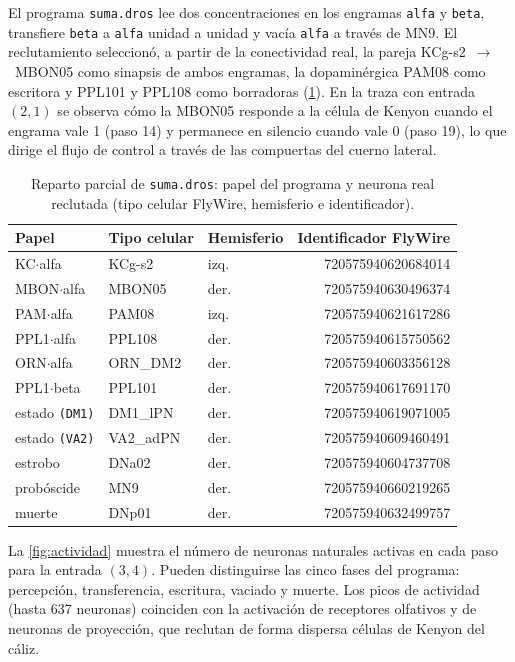 \documentclass[11pt,a4paper]{article}
\theoremstyle{plain}
\theoremstyle{definition}
\theoremstyle{remark}
\begin{document}
El programa \texttt{suma.dros} lee dos concentraciones en los engramas
\texttt{alfa} y \texttt{beta}, transfiere \texttt{beta} a \texttt{alfa} unidad a
unidad y vacía \texttt{alfa} a través de MN9. El reclutamiento seleccionó, a
partir de la conectividad real, la pareja KCg-s2~$\to$~MBON05 como sinapsis
de ambos engramas, la dopaminérgica PAM08 como escritora y PPL101 y PPL108
como borradoras (\cref{tab:reparto}). En la traza con entrada $(2,1)$ se
observa cómo la MBON05 responde a la célula de Kenyon cuando el engrama vale
1 (paso 14) y permanece en silencio cuando vale 0 (paso 19), lo que dirige el
flujo de control a través de las compuertas del cuerno lateral.

\begin{table}[t]
\centering
\caption{Reparto parcial de \texttt{suma.dros}: papel del programa y neurona
real reclutada (tipo celular FlyWire, hemisferio e identificador).}
\label{tab:reparto}
\small
\begin{tabular}{@{}lllr@{}}
\toprule
Papel & Tipo celular & Hemisferio & Identificador FlyWire \\
\midrule
KC$\cdot$alfa         & KCg-s2    & izq. & 720575940620684014 \\
MBON$\cdot$alfa       & MBON05    & der. & 720575940630496374 \\
PAM$\cdot$alfa        & PAM08     & izq. & 720575940621617286 \\
PPL1$\cdot$alfa       & PPL108    & der. & 720575940615750562 \\
ORN$\cdot$alfa        & ORN\_DM2  & der. & 720575940603356128 \\
PPL1$\cdot$beta       & PPL101    & der. & 720575940617691170 \\
estado \texttt{(DM1)} & DM1\_lPN  & der. & 720575940619071005 \\
estado \texttt{(VA2)} & VA2\_adPN & der. & 720575940609460491 \\
estrobo               & DNa02     & der. & 720575940604737708 \\
probóscide            & MN9       & der. & 720575940660219265 \\
muerte                & DNp01     & der. & 720575940632499757 \\
\bottomrule
\end{tabular}
\end{table}

La \cref{fig:actividad} muestra el número de neuronas naturales activas en
cada paso para la entrada $(3,4)$. Pueden distinguirse las cinco fases del
programa: percepción, transferencia, escritura, vaciado y muerte. Los picos
de actividad (hasta 637 neuronas) coinciden con la activación de receptores
olfativos y de neuronas de proyección, que reclutan de forma dispersa
células de Kenyon del cáliz.
\end{document}
